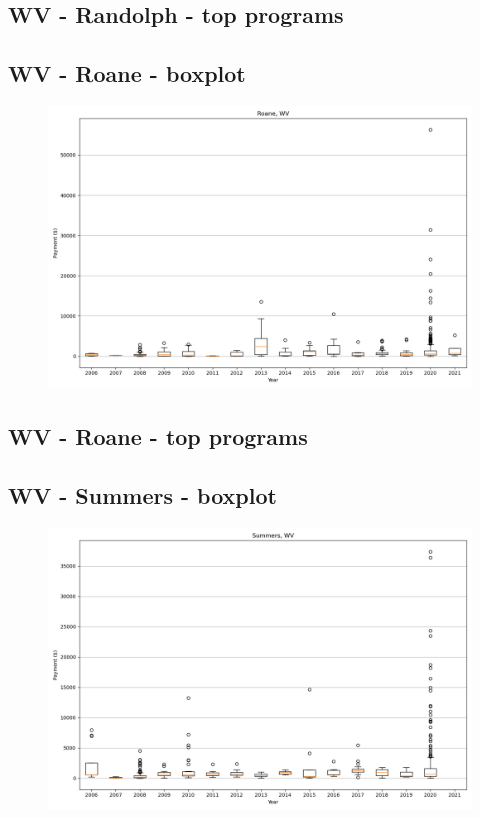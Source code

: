 \subsection*{WV - Randolph - top programs}

\newpage
\subsection*{WV - Roane - boxplot}
\begin{figure}[h]
\centering
\includegraphics[width=7in]{../output/boxplots/counties/Roane-WV_boxplot.png}
\end{figure}


\subsection*{WV - Roane - top programs}

\newpage
\subsection*{WV - Summers - boxplot}
\begin{figure}[h]
\centering
\includegraphics[width=7in]{../output/boxplots/counties/Summers-WV_boxplot.png}
\end{figure}


